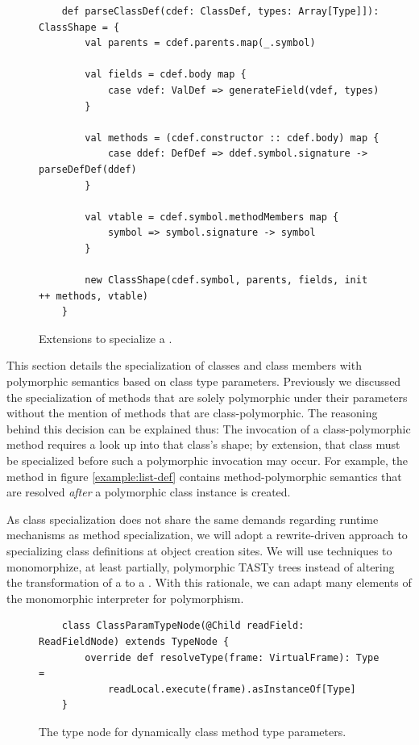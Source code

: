 \begin{figure}[!htb]
	\begin{verbatim}
	def parseClassDef(cdef: ClassDef, types: Array[Type]]): ClassShape = {
		val parents = cdef.parents.map(_.symbol)
			
		val fields = cdef.body map {
			case vdef: ValDef => generateField(vdef, types)	
		}
		
		val methods = (cdef.constructor :: cdef.body) map {
			case ddef: DefDef => ddef.symbol.signature -> parseDefDef(ddef)
		}
			
		val vtable = cdef.symbol.methodMembers map {
			symbol => symbol.signature -> symbol
		}
			
		new ClassShape(cdef.symbol, parents, fields, init ++ methods, vtable)
	}
	\end{verbatim}
	\caption{Extensions to specialize a .}
	\label{impl:specialize-class}
\end{figure}

This section details the specialization of classes and class members with polymorphic semantics based on class type parameters.
Previously we discussed the specialization of methods that are solely polymorphic under their parameters without the mention of methods that are class-polymorphic.
The reasoning behind this decision can be explained thus: The invocation of a class-polymorphic method requires a look up into that class's shape; by extension, that class must be specialized before such a polymorphic invocation may occur.
For example, the method  in figure \ref{example:list-def} contains method-polymorphic semantics that are resolved \textit{after} a polymorphic class instance is created.

As class specialization does not share the same demands regarding runtime mechanisms as method specialization, we will adopt a rewrite-driven approach to specializing class definitions at object creation sites.
We will use techniques to monomorphize, at least partially, polymorphic TASTy trees instead of altering the transformation of a  to a .
With this rationale, we can adapt many elements of the monomorphic interpreter for polymorphism.

\begin{figure}[!htb]
	\begin{verbatim}
	class ClassParamTypeNode(@Child readField: ReadFieldNode) extends TypeNode {
		override def resolveType(frame: VirtualFrame): Type = 
			readLocal.execute(frame).asInstanceOf[Type]
	}
	\end{verbatim}
	\caption{The type node for dynamically class method type parameters.}
	\label{impl:class-param-typenode}
\end{figure}

